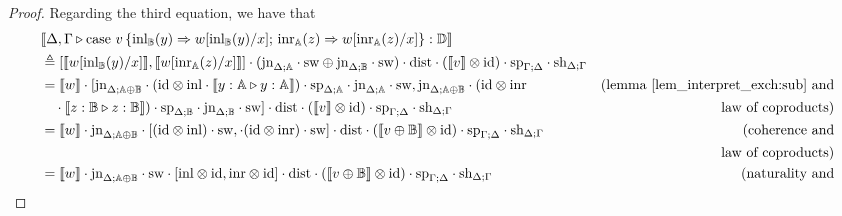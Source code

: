 \documentclass[10pt,a4paper]{amsart}
\theoremstyle{definition}
\theoremstyle{definition}
\theoremstyle{definition}
\theoremstyle{definition}
\theoremstyle{definition}
\theoremstyle{definition}
\begin{document}
\begin{proof}


Regarding the third equation, we have that
\begin{align*}
  & \llbracket \Delta,\Gamma \vljud \text{case } v\, \{\text{inl}_{\typeB} (y) \Rightarrow w [ \text{inl}_{\typeB}(y)/x] ;\, \text{inr}_{\typeA} (z) \Rightarrow w [ \text{inr}_{\typeA}(z)/x]\}: \typeD\rrbracket \\
  & \triangleq  [\llbracket  w [ \text{inl}_{\typeB}(y)/x] \rrbracket, \llbracket  w [ \text{inr}_{\typeA}(z)/x] \rrbracket] \comp (\text{jn}_{\Delta;\typeA} \comp \sw \oplus \text{jn}_{\Delta;\typeB} \comp \sw  ) \comp \dist \comp (\llbracket v\rrbracket \otimes \text{id}) \comp  \text{sp}_{\Gamma;\Delta} \comp \text{sh}_{\Delta;\Gamma} \\
  & = \llbracket w \rrbracket \comp [\text{jn}_{\Delta;\typeA \oplus \typeB} \comp (\text{id} \otimes\inl \comp  \llbracket y:\typeA \vljud y:\typeA  \rrbracket) \comp \text{sp}_{\Delta;\typeA} \comp \text{jn}_{\Delta;\typeA} \comp \sw , 
   \text{jn}_{\Delta;\typeA \oplus \typeB} \comp (\text{id} \otimes\inr  & {\text{(lemma \ref{lem_interpret_exch:sub} and}} \\
  &  \hspace{10pt} \comp \llbracket z:\typeB \vljud z:\typeB  \rrbracket) \comp \text{sp}_{\Delta;\typeB} \comp \text{jn}_{\Delta;\typeB} \comp \sw  ] \comp \dist \comp (\llbracket v\rrbracket \otimes \text{id}) \comp  \text{sp}_{\Gamma;\Delta} \comp \text{sh}_{\Delta;\Gamma} & {\text{law of coproducts)}}  \\
  & =  \llbracket w \rrbracket \comp \text{jn}_{\Delta;\typeA \oplus \typeB} \comp [ (\text{id} \otimes\inl)  \comp \sw  ,     \comp (\text{id} \otimes\inr) \comp \sw  ] \comp \dist  \comp (\llbracket v \oplus \typeB\rrbracket \otimes \text{id})  \comp  \text{sp}_{\Gamma;\Delta} \comp \text{sh}_{\Delta;\Gamma}  & {\text{(coherence and}}   \\
  & \hspace{10pt} & {\text{law of coproducts)}}   \\
  & = \llbracket w \rrbracket \comp \text{jn}_{\Delta;\typeA \oplus \typeB}  \comp   \sw \comp  [\inl \otimes \text{id} , \inr \otimes \text{id}] \comp \dist   \comp (\llbracket v \oplus \typeB\rrbracket \otimes \text{id})  \comp  \text{sp}_{\Gamma;\Delta} \comp \text{sh}_{\Delta;\Gamma}  & {\text{(naturality and}}  \\

\end{align*}
\end{proof}
\end{document}
